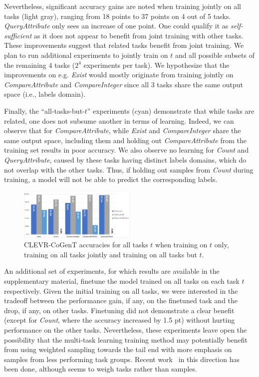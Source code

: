 Nevertheless, significant accuracy gains are noted when training jointly on all tasks (light gray), ranging from 18 points to 37 points on 4 out of 5 tasks. \textit{QueryAttribute} only sees an increase of one point. One could qualify it as \textit{self-sufficient} as it does not appear to benefit from joint training with other tasks. These improvements suggest that related tasks benefit from joint training.
We plan to run additional experiments to jointly train on $t$ and all possible subsets of the remaining 4 tasks ($2^4$ experiments per task). We hypothesize that the improvements on e.g. \textit{Exist} would mostly originate from training jointly on \textit{CompareAttribute} and \textit{CompareInteger} since all 3 tasks share the same output space (i.e., labels domain).

Finally, the ``all-tasks-but-$t$'' experiments (cyan) demonstrate that while tasks are related, one does not subsume another in terms of learning. Indeed, we can observe that for \textit{CompareAttribute}, while \textit{Exist} and \textit{CompareInteger} share the same output space, including them and holding out \textit{CompareAttribute} from the training set results in poor accuracy. We also observe no learning for \textit{Count} and \textit{QueryAttribute}, caused by these tasks having distinct labels domains, which do not overlap with the other tasks. Thus, if holding out samples from \textit{Count} during training, a model will not be able to predict the corresponding labels.

\begin{figure}[!t]
	\centering
	\includegraphics[width=0.5\textwidth]{img/results/CoGenT_results.pdf}
	\caption{CLEVR-CoGenT accuracies for all tasks $t$ when training on $t$ only, training on all tasks jointly and training on all tasks but $t$.} %
	\label{fig:CoGenT-results}
\end{figure}

An additional set of experiments, for which results are available in the supplementary material,
finetune the model trained on all tasks on each task $t$ respectively. Given the initial training on all tasks, we were interested in the tradeoff between the performance gain, if any, on the finetuned task and the drop, if any, on other tasks. Finetuning did not demonstrate a clear benefit (except for \textit{Count}, where the accuracy increased by 1.5 pt) without hurting performance on the other tasks. Nevertheless, these experiments leave open the possibility that the multi-task learning training method may potentially benefit from using weighted sampling towards the tail end with more emphasis on samples from less performing task groups. Recent work~\cite{guo2018dynamic, kendall2018multi} in this direction has been done, although seems to weigh tasks rather than samples.

